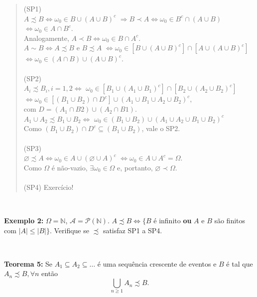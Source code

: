 \documentclass[
]{book}
\begin{document}
\begin{quote}
(SP1)\\
\(A \precsim B \Leftrightarrow \omega_0 \in B \cup (A \cup B)^c\)
\(\Rightarrow B \prec A \Leftrightarrow \omega_0 \in B^c \cap (A \cup B)\)
\(\Leftrightarrow \omega_0 \in A \cap B^c.\)\\
Analogamente, \(A \prec B \Leftrightarrow \omega_0 \in B \cap A^c.\)\\
\(A \sim B \Leftrightarrow A \precsim B\) e \(B \precsim A\)
\(\Leftrightarrow \omega_0 \in [B \cup (A \cup B)^c] \cap [A \cup (A \cup B)^c]\)
\(\Leftrightarrow \omega_0 \in (A \cap B) \cup (A \cup B)^c.\)\\
\(~\)\\
(SP2)\\
\(A_i \precsim B_i , i=1,2 \Leftrightarrow\) \(\omega_0 \in [B_1 \cup (A_1 \cup B_1)^c] \cap [B_2 \cup (A_2 \cup B_2)^c]\) \(\Leftrightarrow \omega_0 \in [(B_1 \cup B_2) \cap D^c] \cup (A_1 \cup B_1 \cup A_2 \cup B_2)^c,\)\\
com \(D = (A_1 \cap B2) \cup (A_2 \cap B1).\)\\
\(A_1 \cup A_2 \precsim B_1 \cup B_2 \Leftrightarrow\) \(\omega_0 \in (B_1 \cup B_2) \cup (A_1 \cup A_2 \cup B_1 \cup B_2)^c\)\\
Como \((B_1 \cup B_2) \cap D^c \subseteq (B_1 \cup B_2)\), vale o SP2.\\
\(~\)\\
(SP3)\\
\(\varnothing \precsim A \Leftrightarrow \omega_0 \in A \cup (\varnothing \cup A)^c\) \(\Leftrightarrow \omega_0 \in A \cup A^c = \Omega.\)\\
Como \(\Omega\) é não-vazio, \(\exists \omega_0 \in \Omega\) e, portanto, \(\varnothing \prec \Omega\).\\
\(~\)\\
(SP4) Exercício!
\end{quote}

\(~\)

\textbf{Exemplo 2:} \(\Omega = \mathbb{N}\), \(\mathcal{A} = \mathcal{P}(\mathbb{N})\). \(A \precsim B \Leftrightarrow \{B\) é infinito \textbf{ou} \(A\) e \(B\) são finitos com \(|A| \leq |B|\}\). Verifique se \(\precsim\) satisfaz SP1 a SP4.

\(~\)

\textbf{Teorema 5:} Se \(A_1 \subseteq A_2 \subseteq \ldots\) é uma sequência crescente de eventos e \(B\) é tal que \(A_n \precsim B, \forall n\) então \[\bigcup_{n \geq 1} A_n \precsim B.\]
\end{document}
